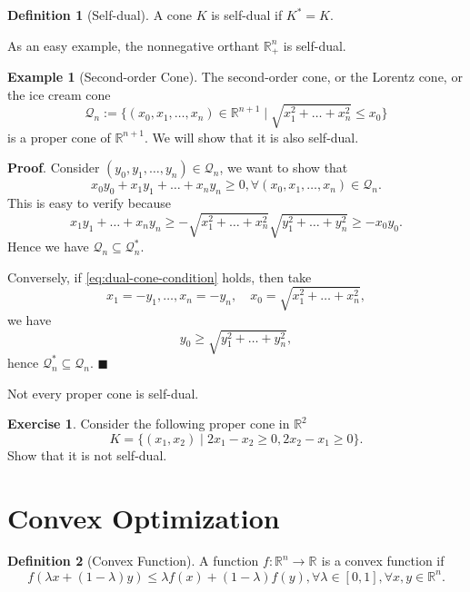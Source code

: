 \documentclass[
]{book}
\theoremstyle{definition}
\newtheorem{definition}{Definition}[chapter]
\theoremstyle{definition}
\newtheorem{example}{Example}[chapter]
\theoremstyle{definition}
\newtheorem{exercise}{Exercise}[chapter]
\theoremstyle{definition}
\theoremstyle{remark}
\begin{document}
\begin{definition}[Self-dual]
\protect\hypertarget{def:selfdual}{}\label{def:selfdual}A cone \(K\) is self-dual if \(K^{*} = K\).
\end{definition}

As an easy example, the nonnegative orthant \(\mathbb{R}^{n}_{+}\) is self-dual.

\begin{example}[Second-order Cone]
\protect\hypertarget{exm:SecondOrderCone}{}\label{exm:SecondOrderCone}The second-order cone, or the Lorentz cone, or the ice cream cone
\[
\mathcal{Q}_n := \{  (x_0,x_1,\dots,x_n) \in \mathbb{R}^{n+1} \mid \sqrt{x_1^2 + \dots + x_n^2} \leq x_0  \}
\]
is a proper cone of \(\mathbb{R}^{n+1}\). We will show that it is also self-dual.

\textbf{Proof}. Consider \((y_0,y_1,\dots,y_n) \in \mathcal{Q}_n\), we want to show that
\begin{equation}
x_0 y_0 + x_1 y_1 + \dots + x_n y_n \geq 0, \forall (x_0,x_1,\dots,x_n) \in \mathcal{Q}_n.
\label{eq:dual-cone-condition}
\end{equation}
This is easy to verify because
\[
x_1 y_1 + \dots + x_n y_n \geq - \sqrt{x_1^2 + \dots + x_n^2} \sqrt{y_1^2 + \dots + y_n^2} \geq - x_0 y_0.
\]
Hence we have \(\mathcal{Q}_n \subseteq \mathcal{Q}_n^{*}\).

Conversely, if \eqref{eq:dual-cone-condition} holds, then take
\[
x_1 = -y_1, \dots, x_n = - y_n, \quad x_0 = \sqrt{x_1^2 + \dots + x_n^2},
\]
we have
\[
y_0 \geq \sqrt{y_1^2 + \dots + y_n^2},
\]
hence \(\mathcal{Q}_n^{*} \subseteq \mathcal{Q}_n\). \(\blacksquare\)
\end{example}

Not every proper cone is self-dual.

\begin{exercise}
Consider the following proper cone in \(\mathbb{R}^{2}\)
\[
K = \{ (x_1,x_2) \mid 2x_1 - x_2 \geq 0, 2x_2 - x_1 \geq 0 \}.
\]
Show that it is not self-dual.
\end{exercise}

\section{Convex Optimization}\label{background:convex:optimization}

\begin{definition}[Convex Function]
\protect\hypertarget{def:ConvexFun}{}\label{def:ConvexFun}A function \(f: \mathbb{R}^{n} \rightarrow \mathbb{R}^{}\) is a convex function if
\[
f(\lambda x + (1-\lambda) y) \leq \lambda f(x) + (1-\lambda) f(y), \forall \lambda \in [0,1], \forall x,y \in \mathbb{R}^{n}.
\]
\end{definition}
\end{document}
